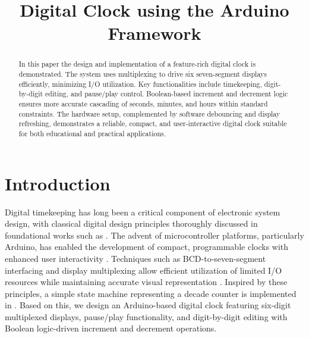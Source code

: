 \documentclass[conference]{IEEEtran}
\title{Digital Clock using the Arduino Framework}
\author{
    \IEEEauthorblockN{Dhawal Saini and G. V. V. Sharma}
    \IEEEauthorblockA{Department of Electrical Engineering\\
    Indian Institute of Technology Hyderabad\\
    Email: gadepall@ee.iith.ac.in}
}
\begin{document}
\maketitle

\begin{abstract}
In this paper the design and implementation of a feature-rich digital clock is demonstrated. The system uses multiplexing to drive six seven-segment displays efficiently, minimizing I/O utilization. Key functionalities include timekeeping, digit-by-digit editing, and pause/play control. Boolean-based increment and decrement logic ensures more accurate cascading of seconds, minutes, and hours within standard constraints. The hardware setup, complemented by software debouncing and display refreshing, demonstrates a reliable, compact, and user-interactive digital clock suitable for both educational and practical applications.
\end{abstract}
\section{Introduction}
Digital timekeeping has long been a critical component of electronic system design, with classical digital design principles thoroughly discussed in foundational works such as \cite{mano2013digital, malvino2017digital, patterson2014computer}. The advent of microcontroller platforms, particularly Arduino, has enabled the development of compact, programmable clocks with enhanced user interactivity \cite{arduino_reference}. Techniques such as BCD-to-seven-segment interfacing and display multiplexing allow efficient utilization of limited I/O resources while maintaining accurate visual representation \cite{ti7447datasheet}. Inspired by these principles, a simple state machine representing a decade counter is  implemented in \cite{ddta}.  Based 
on this, 
we design an Arduino-based digital clock featuring six-digit multiplexed displays, pause/play functionality, and digit-by-digit editing with Boolean logic-driven increment and decrement operations.

%
%
\end{document}
